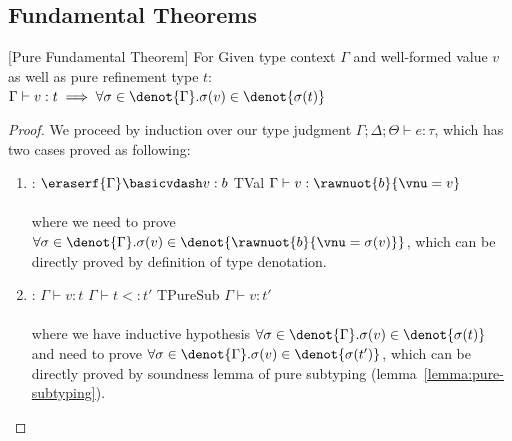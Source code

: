 \subsection{Fundamental Theorems}

\begin{theorem}\label{theorem:pure-fundamental-ap}[Pure Fundamental Theorem] For Given type context $\Gamma$ and well-formed value $v$ as well as pure refinement type $t$:
  $\Gamma \vdash v: t \implies \forall \sigma \in \denot{\Gamma}. \sigma(v) \in \denot{\sigma(t)}$
\end{theorem}
\begin{proof} We proceed by induction over our type judgment $\Gamma;\Delta;\Theta \vdash e : \tau$, which has two cases proved as following:
\begin{enumerate}[label=Case]
\item:
{\footnotesize
\mprooftr{23mm}
{$\eraserf{\Gamma} \basicvdash v : b$}
{TVal}
{$\Gamma \vdash v : \rawnuot{b}{\vnu = v}$}
\ \\ \ \\}
where we need to prove $\forall \sigma \in \denot{\Gamma}. \sigma(v) \in\denot{\rawnuot{b}{\vnu = \sigma(v)}}$, which can be directly proved by definition of type denotation.
\item:
{\footnotesize
\mprooftr{38mm}
{$\Gamma \vdash v : t$ \quad
$\Gamma \vdash t <: t'$}
{TPureSub}
{$\Gamma \vdash v : t'$}
\ \\ \ \\}
where we have inductive hypothesis $\forall \sigma \in \denot{\Gamma}. \sigma(v) \in\denot{\sigma(t)}$ and need to prove $\forall \sigma \in \denot{\Gamma}. \sigma(v) \in\denot{\sigma(t')}$, which can be directly proved by soundness lemma of pure subtyping (lemma~\ref{lemma:pure-subtyping}).
\end{enumerate}
\end{proof}



